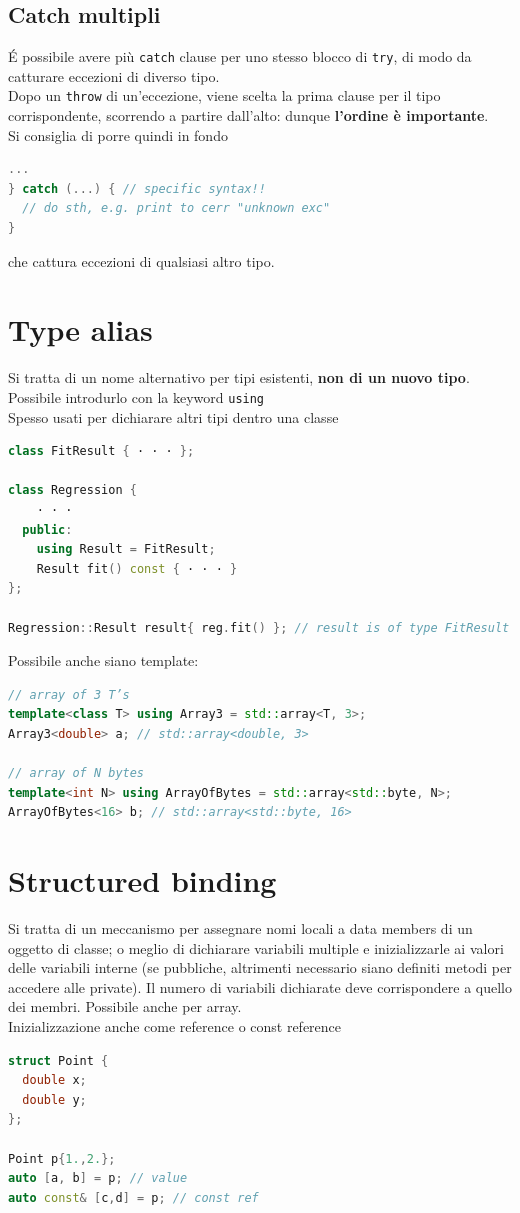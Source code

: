 \documentclass[10pt, oneside]{book}
\begin{document}
\subsection{Catch multipli}
\'E possibile avere più \texttt{catch} clause per uno stesso blocco di \texttt{try}, di modo da catturare eccezioni di diverso tipo.\\
Dopo un \texttt{throw} di un'eccezione, viene scelta la prima clause per il tipo corrispondente, scorrendo a partire dall'alto: dunque \textbf{l'ordine è importante}.\\
Si consiglia di porre quindi in fondo
\begin{lstlisting}[language=C++]
...
} catch (...) { // specific syntax!!
  // do sth, e.g. print to cerr "unknown exc"
}
\end{lstlisting}
che cattura eccezioni di qualsiasi altro tipo.

\section{Type alias}
Si tratta di un nome alternativo per tipi esistenti, \textbf{non di un nuovo tipo}. Possibile introdurlo con la keyword \texttt{using}\\
Spesso usati per dichiarare altri tipi dentro una classe
\begin{lstlisting}[language=C++]
class FitResult { · · · };

class Regression {
    · · ·
  public:
    using Result = FitResult;
    Result fit() const { · · · }
};

Regression::Result result{ reg.fit() }; // result is of type FitResult
\end{lstlisting}
Possibile anche siano template:
\begin{lstlisting}[language=C++]
// array of 3 T’s
template<class T> using Array3 = std::array<T, 3>;
Array3<double> a; // std::array<double, 3>

// array of N bytes
template<int N> using ArrayOfBytes = std::array<std::byte, N>;
ArrayOfBytes<16> b; // std::array<std::byte, 16>
\end{lstlisting}


\section{Structured binding}
Si tratta di un meccanismo per assegnare nomi locali a data members di un oggetto di classe; o meglio di dichiarare variabili multiple e inizializzarle ai valori delle variabili interne (se pubbliche, altrimenti necessario siano definiti metodi per accedere alle private). Il numero di variabili dichiarate deve corrispondere a quello dei membri. Possibile anche per array.\\
Inizializzazione anche come reference o const reference
\begin{lstlisting}[language=C++]
struct Point {
  double x;
  double y;
};

Point p{1.,2.};
auto [a, b] = p; // value
auto const& [c,d] = p; // const ref
\end{lstlisting}
\end{document}
